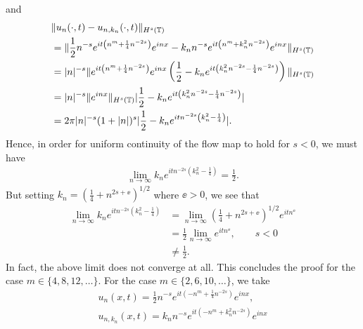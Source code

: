 %
%
and
%
%
\begin{equation*}
	\begin{split}
		& \|u_{n}(\cdot, t) - u_{n, k_{n}}(\cdot, t) \|_{H^{s}(\mathbb{T})}
		\\
		& = \|\frac{1}{2}n^{-s}e^{it\left( n^{m} + \frac{1}{4}n^{-2s}
		\right)}e^{inx} - k_{n}n^{-s}e^{it\left( n^{m} + k_{n}^{2}n^{-2s}
		\right)}e^{inx} \|_{H^{s}(\mathbb{T})}
		\\
		& = | n |^{-s} \|e^{it\left( n^{m} + \frac{1}{4}n^{-2s}
		\right)}e^{inx}\left( \frac{1}{2} - k_{n}e^{it\left(
		k_{n}^{2}n^{-2s}-\frac{1}{4}n^{-2s} \right)} \right)\|_{H^{s}(\mathbb{T})}
		\\
		& = | n|^{-s} \|e^{inx} \|_{H^{s}(\mathbb{T})}
    | \frac{1}{2} - k_{n}e^{it\left(
    k_{n}^{2}n^{-2s} - \frac{1}{4}n^{-2s} \right )}|
		\\
    & = 2 \pi | n |^{-s} (1 + | n |)^{s} | \frac{1}{2} - k_{n}e^{itn^{-2s}\left(
    k_{n}^{2}- \frac{1}{4}\right)} |.
	\end{split}
\end{equation*}
%
%
Hence, in order for uniform continuity of the flow map to hold for $s < 0$, we must have
%
%
\begin{equation*}
	\begin{split}
		\lim_{n \to \infty}  k_{n} e^{itn^{-2s}\left( k_{n}^{2} -
		\frac{1}{4} \right)}  = \frac{1}{2}.
	\end{split}
\end{equation*}
%
%
But setting $k_{n} = \left( \frac{1}{4} + n^{2s + \ee} \right)^{1/2}$ where  $\ee >
0$, we see that 
%
%
\begin{equation*}
	\begin{split}
		\lim_{n \to \infty} k_{n} e^{itn^{-2s}\left( k_{n}^{2} - \frac{1}{4}
		\right)}
    & = \lim_{n \to \infty} \left( \frac{1}{4} + n^{2s + \ee} \right)^{1/2}
    e^{itn^{\ee}} \\ & = \frac{1}{2} \lim_{n \to \infty} e^{itn^{\ee}}, \qquad s
    < 0
    \\
    & \neq \frac{1}{2}.
	\end{split}
\end{equation*}
%
%
In fact, the above limit does not converge at all. This concludes the proof for
the case $m \in \{4, 8, 12, \dots \}$. For the case $m \in \{2, 6, 10, \dots \}$, we take
%
%
\begin{equation*}
	\begin{split}
		u_{n}(x,t) = \frac{1}{2}n^{-s}e^{it\left( -n^{m} + \frac{1}{4}n^{-2s}
		\right)}e^{inx},
		\\ u_{n, k_{n}}(x,t) = k_{n}n^{-s}e^{it\left( -n^{m} + k_{n}^{2}n^{-2s}
		\right)}e^{inx} 
	\end{split}
\end{equation*}
